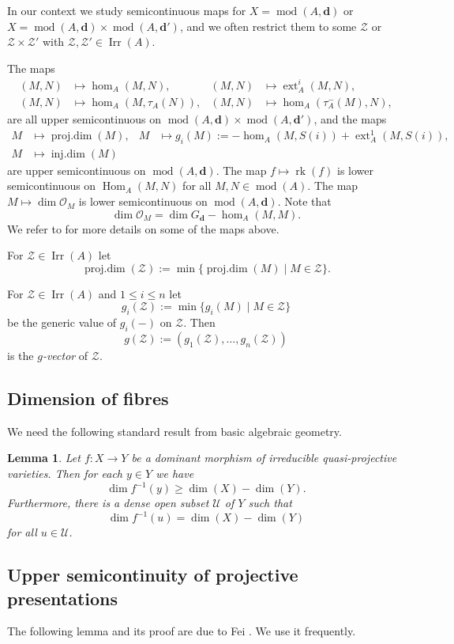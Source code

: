 \documentclass[12pt,reqno]{amsart}
\newtheorem{Lem}[Thm]{Lemma}
\theoremstyle{definition}
\newcommand{\df}{\colon}
\newcommand{\cO}{{\mathcal O}}
\newcommand{\bd}{\mathbf{d}}
\newcommand{\rk}{\operatorname{rk}}
\newcommand{\md}{\operatorname{mod}}
\newcommand{\pdim}{\operatorname{proj.dim}}
\newcommand{\idim}{\operatorname{inj.dim}}
\newcommand{\Hom}{\operatorname{Hom}}
\newcommand{\ext}{\operatorname{ext}}
\newcommand{\irr}{\operatorname{Irr}}
\newcommand{\calU}{\mathcal{U}}
\newcommand{\calZ}{\mathcal{Z}}
\begin{document}
In our context we study semicontinuous maps for $X = \md(A,\bd)$
or $X = \md(A,\bd) \times \md(A,\bd')$,
and we often restrict them to some
$\calZ$ or $\calZ \times \calZ'$ with $\calZ,\calZ' \in \irr(A)$.

The maps
\begin{align*}
(M,N) &\mapsto \hom_A(M,N),
&
(M,N) & \mapsto \ext_A^i(M,N),
\\
(M,N) & \mapsto \hom_A(M,\tau_A(N)),
&
(M,N) & \mapsto \hom_A(\tau_A^-(M),N),
\end{align*}
are all upper semicontinuous on
$\md(A,\bd) \times \md(A,\bd')$,
and the maps
\begin{align*}
M &\mapsto \pdim(M),
&
M & \mapsto g_i(M) := - \hom_A(M,S(i)) + \ext_A^1(M,S(i)),
\\
M & \mapsto \idim(M)
\end{align*}
are upper semicontinuous on
$\md(A,\bd)$.
The map
$f \mapsto \rk(f)$ is
lower semicontinuous on $\Hom_A(M,N)$ for all
$M,N \in \md(A)$.
The map $M \mapsto \dim \cO_M$ is lower semicontinuous
on $\md(A,\bd)$.
Note that
$$
\dim \cO_M = \dim G_\bd - \hom_A(M,M).
$$
We refer to \cite{GLFS23} for more details on some of the maps above.

For $\calZ \in \irr(A)$ let
$$
\pdim(\calZ) := \min\{ \pdim(M) \mid M \in \calZ \}.
$$

For $\calZ \in \irr(A)$ and $1 \le i \le n$ let
$$
g_i(\calZ) := \min\{ g_i(M) \mid M \in \calZ \}
$$
be the generic value of $g_i(-)$ on $\calZ$.
Then
$$
g(\calZ) := (g_1(\calZ),\ldots,g_n(\calZ))
$$
is the \emph{$g$-vector} of $\calZ$.

\subsection{Dimension of fibres}
We need the following standard result from basic algebraic geometry.

\begin{Lem}\label{lem:chevalley}
Let $f\df X \to Y$ be a dominant morphism of
irreducible quasi-projective varieties.
Then for each $y \in Y$ we have
$$
\dim f^{-1}(y) \ge \dim(X) - \dim(Y).
$$
Furthermore, there is a dense open subset $\calU$ of $Y$ such that
$$
\dim f^{-1}(u) = \dim(X) - \dim(Y)
$$
for all $u \in \calU$.
\end{Lem}


\subsection{Upper semicontinuity of projective presentations}
The following lemma and its proof are due to
Fei \cite{F23b}.
We use it frequently.
\end{document}
